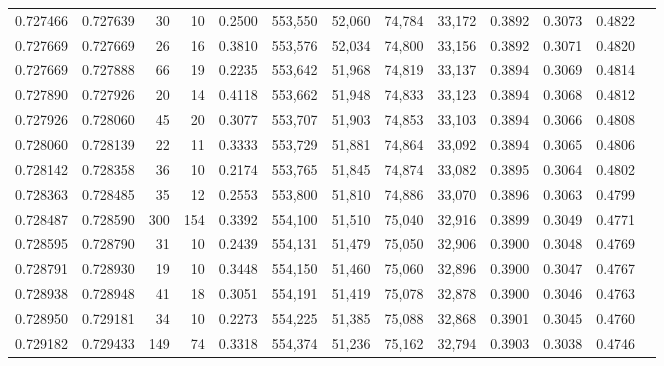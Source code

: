 \begin{tabular}{rrrrrrrrrrrrr}
0.727466 & 0.727639 &    30 &  10 &                                     0.2500 & 553,550 &  52,060 &  74,784 &  33,172 & 0.3892 & 0.3073 & 0.4822 \\
0.727669 & 0.727669 &    26 &  16 &                                     0.3810 & 553,576 &  52,034 &  74,800 &  33,156 & 0.3892 & 0.3071 & 0.4820 \\
0.727669 & 0.727888 &    66 &  19 &                                     0.2235 & 553,642 &  51,968 &  74,819 &  33,137 & 0.3894 & 0.3069 & 0.4814 \\
0.727890 & 0.727926 &    20 &  14 &                                     0.4118 & 553,662 &  51,948 &  74,833 &  33,123 & 0.3894 & 0.3068 & 0.4812 \\
0.727926 & 0.728060 &    45 &  20 &                                     0.3077 & 553,707 &  51,903 &  74,853 &  33,103 & 0.3894 & 0.3066 & 0.4808 \\
0.728060 & 0.728139 &    22 &  11 &                                     0.3333 & 553,729 &  51,881 &  74,864 &  33,092 & 0.3894 & 0.3065 & 0.4806 \\
0.728142 & 0.728358 &    36 &  10 &                                     0.2174 & 553,765 &  51,845 &  74,874 &  33,082 & 0.3895 & 0.3064 & 0.4802 \\
0.728363 & 0.728485 &    35 &  12 &                                     0.2553 & 553,800 &  51,810 &  74,886 &  33,070 & 0.3896 & 0.3063 & 0.4799 \\
0.728487 & 0.728590 &   300 & 154 &                                     0.3392 & 554,100 &  51,510 &  75,040 &  32,916 & 0.3899 & 0.3049 & 0.4771 \\
0.728595 & 0.728790 &    31 &  10 &                                     0.2439 & 554,131 &  51,479 &  75,050 &  32,906 & 0.3900 & 0.3048 & 0.4769 \\
0.728791 & 0.728930 &    19 &  10 &                                     0.3448 & 554,150 &  51,460 &  75,060 &  32,896 & 0.3900 & 0.3047 & 0.4767 \\
0.728938 & 0.728948 &    41 &  18 &                                     0.3051 & 554,191 &  51,419 &  75,078 &  32,878 & 0.3900 & 0.3046 & 0.4763 \\
0.728950 & 0.729181 &    34 &  10 &                                     0.2273 & 554,225 &  51,385 &  75,088 &  32,868 & 0.3901 & 0.3045 & 0.4760 \\
0.729182 & 0.729433 &   149 &  74 &                                     0.3318 & 554,374 &  51,236 &  75,162 &  32,794 & 0.3903 & 0.3038 & 0.4746 \\

\end{tabular}

